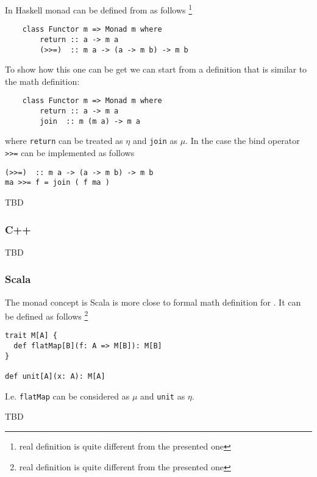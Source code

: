 \begin{example}
\label{ex:monad_haskell}
In Haskell monad can be defined from  as follows 
\footnote{real definition is quite different from the presented one}
\begin{verbatim}
    class Functor m => Monad m where
        return :: a -> m a
        (>>=)  :: m a -> (a -> m b) -> m b
\end{verbatim} 

To show how this one can be get we can start from a definition that is
similar to the math definition:
\begin{verbatim}
    class Functor m => Monad m where
        return :: a -> m a
        join  :: m (m a) -> m a
\end{verbatim} 
where \texttt{return} can be treated as $\eta$ and 
\texttt{join} as $\mu$. In the case the bind operator 
\texttt{>>=} can be implemented as follows
\begin{verbatim}
(>>=)  :: m a -> (a -> m b) -> m b
ma >>= f = join ( f ma )
\end{verbatim} 

\end{example}

TBD

\subsubsection{C++}

TBD

\subsubsection{Scala}

\begin{example}
The monad concept is Scala is more close to formal math definition for
. It can be defined as follows 
\footnote{real definition is quite different from the presented one}
\label{ex:monad_scala}
\begin{verbatim}
trait M[A] {
  def flatMap[B](f: A => M[B]): M[B]
}
  
def unit[A](x: A): M[A]
\end{verbatim} 
I.e. \texttt{flatMap} can be considered as $\mu$ and
\texttt{unit} as $\eta$. 
\end{example}

TBD

